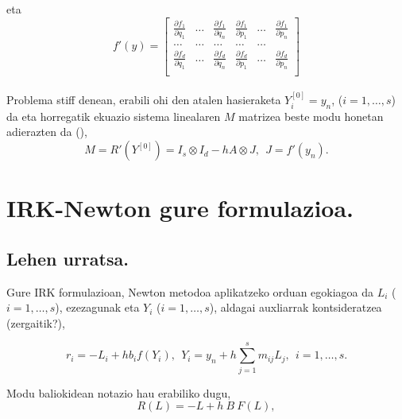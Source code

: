 eta 
\begin{equation*}
f'(y)=
\begin{bmatrix}
    \frac{\partial f_1}{\partial q_1} & \dots & \frac{\partial f_1}{\partial q_n} & \frac{\partial f_{1}}{\partial p_1} & \dots & \frac{\partial f_{1}}{\partial p_n}\\    
    \dots & \dots & \dots  & \dots & \dots\\    
    \frac{\partial f_d}{\partial q_1} & \dots & \frac{\partial f_d}{\partial q_n} & \frac{\partial f_{d}}{\partial p_1} & \dots & \frac{\partial f_{d}}{\partial p_n}\\ 
\end{bmatrix}
\end{equation*}

\paragraph*{}Problema stiff denean, erabili ohi den atalen hasieraketa $Y_i^{[0]}=y_n$, ($i=1,\dots,s$) da eta horregatik ekuazio sistema linealaren $M$ matrizea beste modu honetan adierazten da (\cite{Hairer2006}), 
\begin{equation*}
M=R'(Y^{[0]})=I_s \otimes I_d - h A \otimes J, \ \ J=f'(y_n).
\end{equation*}

\section{IRK-Newton gure formulazioa.}

\subsection*{Lehen urratsa.}

Gure IRK formulazioan, Newton metodoa aplikatzeko orduan egokiagoa da $L_i$ ($i=1,\dots,s$), ezezagunak eta $Y_i$ ($i=1,\dots,s$), aldagai auxliarrak kontsideratzea (zergaitik?),

\begin{equation*}
r_i=-L_i+hb_i f(Y_i), \ \      Y_i=y_n+h \sum\limits_{j=1}^{s} m_{ij} L_j, \ \ i=1,\dots,s.
\end{equation*}

Modu baliokidean notazio hau erabiliko dugu,
\begin{equation*}
R(L)=-L+ h \ B \ F(L), 
\end{equation*}  

